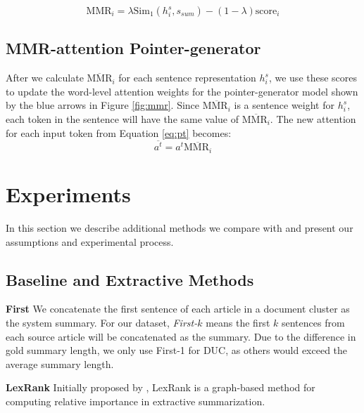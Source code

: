 \documentclass[11pt,a4paper]{article}
\begin{document}
\vspace{+2mm}
\begin{dmath} 
\label{eq:mmr-doc1}
{ {\text{MMR}} _{ i} } = \lambda { \text{Sim} }_{ 1 } (h^s_{i},s_{sum})-(1-\lambda ) \text{score}_{i}
\end{dmath}


\subsection{MMR-attention Pointer-generator}

After we calculate ${\overline{\text{MMR}}_{i}}$ for each sentence representation $h^s_{i}$, we use these scores to update the word-level attention weights for the pointer-generator model shown by the blue arrows in Figure \ref{fig:mmr}. Since $\overline{{\text{MMR}}_{i}}$ is a sentence weight for $h^s_{i}$, each token in the sentence will have the same value of $\overline{{\text{MMR}}_{i}}$. The new attention for each input token from Equation \ref{eq:pt} becomes: 
\begin{equation}
    \overline {a^{t}}=a^t \overline{{\text{MMR}}_i}    
\end{equation}


\section{Experiments}
In this section we describe additional methods we compare with and present our assumptions and experimental process.













\subsection{Baseline and Extractive Methods}
\textbf{First} We concatenate the first sentence of each article in a document cluster as the system summary. For our dataset, \textit{First-$k$} means the first $k$ sentences from each source article will be concatenated as the summary. Due to the difference in gold summary length, we only use First-1 for DUC, as others would exceed the average summary length.

\noindent\textbf{LexRank} Initially proposed by \cite{erkan2004lexrank}, LexRank is a graph-based method for computing relative importance in extractive summarization.
\end{document}

